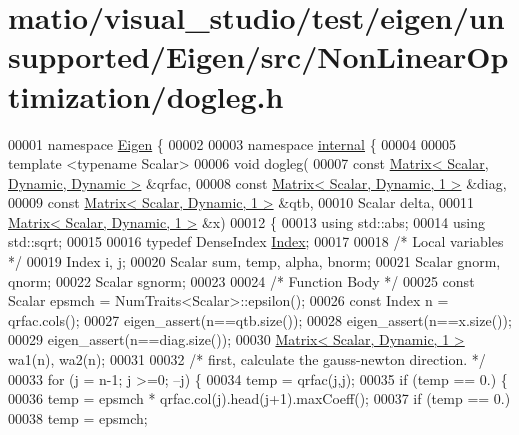 \hypertarget{matio_2visual__studio_2test_2eigen_2unsupported_2_eigen_2src_2_non_linear_optimization_2dogleg_8h_source}{}\section{matio/visual\+\_\+studio/test/eigen/unsupported/\+Eigen/src/\+Non\+Linear\+Optimization/dogleg.h}
\label{matio_2visual__studio_2test_2eigen_2unsupported_2_eigen_2src_2_non_linear_optimization_2dogleg_8h_source}

\begin{DoxyCode}
00001 \textcolor{keyword}{namespace }\hyperlink{namespace_eigen}{Eigen} \{ 
00002 
00003 \textcolor{keyword}{namespace }\hyperlink{namespaceinternal}{internal} \{
00004 
00005 \textcolor{keyword}{template} <\textcolor{keyword}{typename} Scalar>
00006 \textcolor{keywordtype}{void} dogleg(
00007         \textcolor{keyword}{const} \hyperlink{group___core___module}{Matrix< Scalar, Dynamic, Dynamic >}  &qrfac,
00008         \textcolor{keyword}{const} \hyperlink{group___core___module}{Matrix< Scalar, Dynamic, 1 >}  &diag,
00009         \textcolor{keyword}{const} \hyperlink{group___core___module}{Matrix< Scalar, Dynamic, 1 >}  &qtb,
00010         Scalar delta,
00011         \hyperlink{group___core___module}{Matrix< Scalar, Dynamic, 1 >}  &x)
00012 \{
00013     \textcolor{keyword}{using} std::abs;
00014     \textcolor{keyword}{using} std::sqrt;
00015     
00016     \textcolor{keyword}{typedef} DenseIndex \hyperlink{namespace_eigen_a62e77e0933482dafde8fe197d9a2cfde}{Index};
00017 
00018     \textcolor{comment}{/* Local variables */}
00019     Index i, j;
00020     Scalar sum, temp, alpha, bnorm;
00021     Scalar gnorm, qnorm;
00022     Scalar sgnorm;
00023 
00024     \textcolor{comment}{/* Function Body */}
00025     \textcolor{keyword}{const} Scalar epsmch = NumTraits<Scalar>::epsilon();
00026     \textcolor{keyword}{const} Index n = qrfac.cols();
00027     eigen\_assert(n==qtb.size());
00028     eigen\_assert(n==x.size());
00029     eigen\_assert(n==diag.size());
00030     \hyperlink{group___core___module}{Matrix< Scalar, Dynamic, 1 >}  wa1(n), wa2(n);
00031 
00032     \textcolor{comment}{/* first, calculate the gauss-newton direction. */}
00033     \textcolor{keywordflow}{for} (j = n-1; j >=0; --j) \{
00034         temp = qrfac(j,j);
00035         \textcolor{keywordflow}{if} (temp == 0.) \{
00036             temp = epsmch * qrfac.col(j).head(j+1).maxCoeff();
00037             \textcolor{keywordflow}{if} (temp == 0.)
00038                 temp = epsmch;

\end{DoxyCode}
